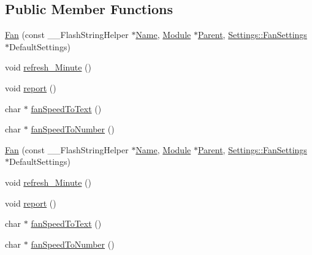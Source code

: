 \subsection*{Public Member Functions}
\begin{DoxyCompactItemize}
\item 
\hyperlink{class_fan_a2bf10abddbcad94045ad7e3d567f17b8}{Fan} (const \+\_\+\+\_\+\+Flash\+String\+Helper $\ast$\hyperlink{class_common_aeea91a726dbe988e515057b32ba0726f}{Name}, \hyperlink{class_module}{Module} $\ast$\hyperlink{class_fan_ab57a7efd60bf06472195dd1d63f0017f}{Parent}, \hyperlink{struct_settings_1_1_fan_settings}{Settings\+::\+Fan\+Settings} $\ast$Default\+Settings)
\item 
void \hyperlink{class_fan_ad4605196f9611585e9416bcce3d84723}{refresh\+\_\+\+Minute} ()
\item 
void \hyperlink{class_fan_a7f1ba729d418cc2109199b2392c37902}{report} ()
\item 
char $\ast$ \hyperlink{class_fan_a492f2551cf8f05d4ce64911807269764}{fan\+Speed\+To\+Text} ()
\item 
char $\ast$ \hyperlink{class_fan_acd41482f79dd009bcecd7740f8dbf002}{fan\+Speed\+To\+Number} ()
\item 
\hyperlink{class_fan_a2bf10abddbcad94045ad7e3d567f17b8}{Fan} (const \+\_\+\+\_\+\+Flash\+String\+Helper $\ast$\hyperlink{class_common_aeea91a726dbe988e515057b32ba0726f}{Name}, \hyperlink{class_module}{Module} $\ast$\hyperlink{class_fan_ab57a7efd60bf06472195dd1d63f0017f}{Parent}, \hyperlink{struct_settings_1_1_fan_settings}{Settings\+::\+Fan\+Settings} $\ast$Default\+Settings)
\item 
void \hyperlink{class_fan_ad4605196f9611585e9416bcce3d84723}{refresh\+\_\+\+Minute} ()
\item 
void \hyperlink{class_fan_a7f1ba729d418cc2109199b2392c37902}{report} ()
\item 
char $\ast$ \hyperlink{class_fan_ad1733d51556ca00cce7e9f2ed129de5f}{fan\+Speed\+To\+Text} ()
\item 
char $\ast$ \hyperlink{class_fan_a02c3e5b711ec48e5790985c38998e841}{fan\+Speed\+To\+Number} ()
\end{DoxyCompactItemize}
